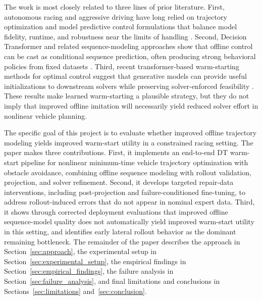 The work is most closely related to three lines of prior literature. First, autonomous racing and aggressive driving have long relied on trajectory optimization and model predictive control formulations that balance model fidelity, runtime, and robustness near the limits of handling \cite{kapania2015sequential,subosits2020road,subosits2021fidelity}. Second, Decision Transformer and related sequence-modeling approaches show that offline control can be cast as conditional sequence prediction, often producing strong behavioral policies from fixed datasets \cite{chen2021decision}. Third, recent transformer-based warm-starting methods for optimal control suggest that generative models can provide useful initializations to downstream solvers while preserving solver-enforced feasibility \cite{guffanti2024art,celestini2024transformermpc}. These results make learned warm-starting a plausible strategy, but they do not imply that improved offline imitation will necessarily yield reduced solver effort in nonlinear vehicle planning.

The specific goal of this project is to evaluate whether improved offline trajectory modeling yields improved warm-start utility in a constrained racing setting. The paper makes three contributions. First, it implements an end-to-end DT warm-start pipeline for nonlinear minimum-time vehicle trajectory optimization with obstacle avoidance, combining offline sequence modeling with rollout validation, projection, and solver refinement. Second, it develops targeted repair-data interventions, including post-projection and failure-conditioned fine-tuning, to address rollout-induced errors that do not appear in nominal expert data. Third, it shows through corrected deployment evaluations that improved offline sequence-model quality does not automatically yield improved warm-start utility in this setting, and identifies early lateral rollout behavior as the dominant remaining bottleneck. The remainder of the paper describes the approach in Section~\ref{sec:approach}, the experimental setup in Section~\ref{sec:experimental_setup}, the empirical findings in Section~\ref{sec:empirical_findings}, the failure analysis in Section~\ref{sec:failure_analysis}, and final limitations and conclusions in Sections~\ref{sec:limitations} and~\ref{sec:conclusion}.
